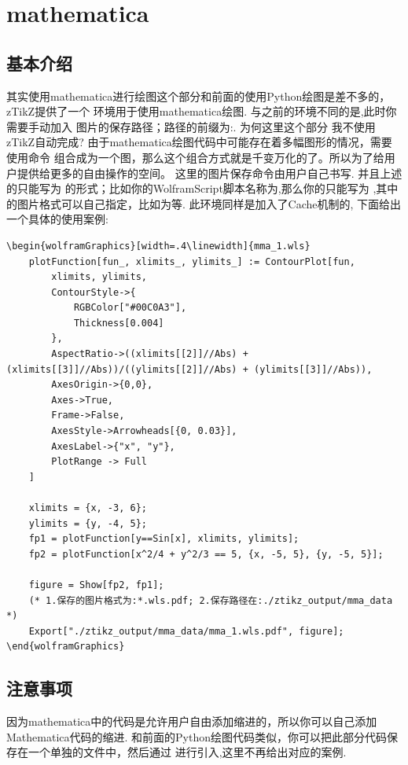 \section{mathematica}
\subsection{基本介绍}
其实使用mathematica进行绘图这个部分和前面的使用Python绘图是差不多的，zTikZ提供了一个
环境用于使用mathematica绘图. 与之前的环境不同的是,此时你需要手动加入
图片的保存路径；路径的前缀为:. 为何这里这个部分
我不使用zTikZ自动完成? 由于mathematica绘图代码中可能存在着多幅图形的情况，需要使用命令
组合成为一个图，那么这个组合方式就是千变万化的了。所以为了给用户提供给更多的自由操作的空间。
这里的图片保存命令由用户自己书写. 并且上述的只能写为
的形式；比如你的WolframScript脚本名称为,那么你的只能写为
,其中的图片格式可以自己指定，比如为等. 此环境同样是加入了Cache机制的,
下面给出一个具体的使用案例:

\begin{verbatim}
\begin{wolframGraphics}[width=.4\linewidth]{mma_1.wls}
    plotFunction[fun_, xlimits_, ylimits_] := ContourPlot[fun, 
        xlimits, ylimits,
        ContourStyle->{
            RGBColor["#00C0A3"], 
            Thickness[0.004]
        },
        AspectRatio->((xlimits[[2]]//Abs) + (xlimits[[3]]//Abs))/((ylimits[[2]]//Abs) + (ylimits[[3]]//Abs)), 
        AxesOrigin->{0,0}, 
        Axes->True,
        Frame->False,
        AxesStyle->Arrowheads[{0, 0.03}],
        AxesLabel->{"x", "y"},
        PlotRange -> Full
    ]
    
    xlimits = {x, -3, 6};
    ylimits = {y, -4, 5};
    fp1 = plotFunction[y==Sin[x], xlimits, ylimits];
    fp2 = plotFunction[x^2/4 + y^2/3 == 5, {x, -5, 5}, {y, -5, 5}];
    
    figure = Show[fp2, fp1];
    (* 1.保存的图片格式为:*.wls.pdf; 2.保存路径在:./ztikz_output/mma_data *)
    Export["./ztikz_output/mma_data/mma_1.wls.pdf", figure];
\end{wolframGraphics}
\end{verbatim}

\subsection{注意事项}
因为mathematica中的代码是允许用户自由添加缩进的，所以你可以自己添加Mathematica代码的缩进.
和前面的Python绘图代码类似，你可以把此部分代码保存在一个单独的文件中，然后通过\cmd{}
进行引入,这里不再给出对应的案例.

